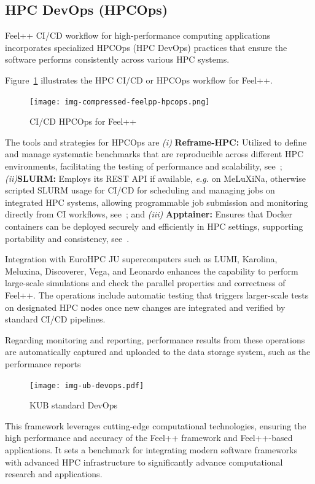 \documentclass[runningheads]{llncs}
\begin{document}
\subsection{HPC DevOps (HPCOps)}
Feel++ CI/CD workflow for high-performance computing applications incorporates specialized HPCOps (HPC DevOps) practices that ensure the software performs consistently across various HPC systems. 


Figure~\ref{fig:feelpp-hpcops} illustrates the HPC CI/CD or HPCOps workflow for Feel++. 
\begin{figure}
    \centering
    \texttt{[image: img-compressed-feelpp-hpcops.png]}
    \caption{CI/CD HPCOps for Feel++}
    \label{fig:feelpp-hpcops}
\end{figure}

The tools and strategies for HPCOps are  \textit{(i) }\textbf{Reframe-HPC:} Utilized to define and manage systematic benchmarks that are reproducible across different HPC environments, facilitating the testing of performance and scalability, see~\cite{karakasis_reframe-hpcreframe_2024};
\textit{(ii)}\textbf{SLURM:} Employs its REST API if available, \textit{e.g.} on MeLuXiNa, otherwise scripted SLURM usage for CI/CD for scheduling and managing jobs on integrated HPC systems, allowing programmable job submission and monitoring directly from CI workflows, see~\cite{slurm_development_team_slurm_2024}; and \textit{(iii)} \textbf{Apptainer:} Ensures that Docker containers can be deployed securely and efficiently in HPC settings, supporting portability and consistency, see~\cite{apptainer_contributors_apptainer_2024}.

Integration with EuroHPC JU supercomputers such as LUMI, Karolina, Meluxina, Discoverer, Vega, and Leonardo enhances the capability to perform large-scale simulations and check the parallel properties and correctness of Feel++. The operations include automatic testing that triggers larger-scale tests on designated HPC nodes once new changes are integrated and verified by standard CI/CD pipelines.

Regarding monitoring and reporting, performance results from these operations are automatically captured and uploaded to the data storage system, such as the performance reports 

\begin{figure}
    \centering
    \texttt{[image: img-ub-devops.pdf]}
    \caption{KUB standard DevOps}
    \label{fig:kub-devops}
\end{figure}
This framework leverages cutting-edge computational technologies, ensuring the high performance and accuracy of the Feel++ framework and Feel++-based applications. 
It sets a benchmark for integrating modern software frameworks with advanced HPC infrastructure to significantly advance computational research and applications.
\end{document}
